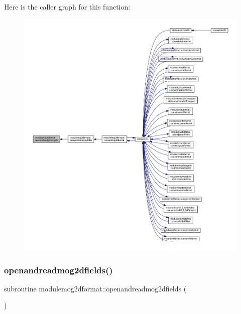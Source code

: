 Here is the caller graph for this function\+:\nopagebreak
\begin{figure}[H]
\begin{center}
\leavevmode
\includegraphics[width=350pt]{namespacemodulemog2dformat_aae3ca34111cfb5aa29845bcbac420694_icgraph}
\end{center}
\end{figure}
\mbox{\label{namespacemodulemog2dformat_a49362eefaf162d386ec42c4957e72b1a}} 
\subsubsection{\texorpdfstring{openandreadmog2dfields()}{openandreadmog2dfields()}}
{\footnotesize\ttfamily subroutine modulemog2dformat\+::openandreadmog2dfields (\begin{DoxyParamCaption}{ }\end{DoxyParamCaption})\hspace{0.3cm}{\ttfamily [private]}}

